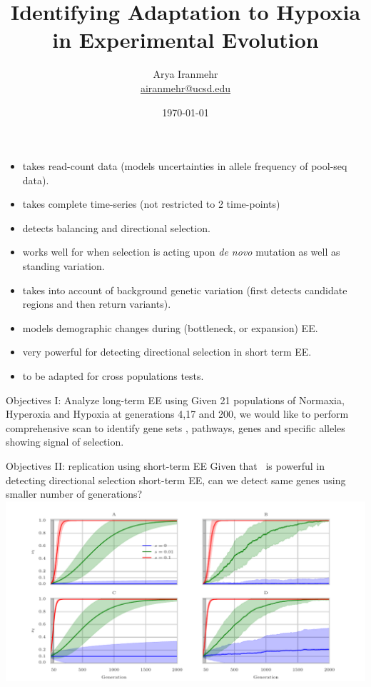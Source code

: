 \documentclass[t]{beamer} %
\title{Identifying Adaptation to Hypoxia in Experimental Evolution}
\subtitle{}
\author[Arya Iranmehr]
{%
  \texorpdfstring{
      \centering
      Arya Iranmehr\\
      \href{mailto:airanmehr@ucsd.edu}{airanmehr@ucsd.edu}
  }
  {Arya Iranmehr}
}
\institute{
Bafna Lab\\
University of California, San Diego}
\date{
\monthyeardate\today}
\begin{document}
\begin{frame}
  \titlepage
\end{frame}


\begin{frame}{	\comale }

\begin{itemize}
\item takes read-count data (models uncertainties in allele frequency of 
pool-seq data).
\item takes complete time-series (not restricted to 2 time-points)
\item detects balancing and directional selection.
\item works well for when selection is acting upon \emph{de novo} mutation as 
well as standing variation.
\item takes into account of background genetic variation (first detects 
candidate regions and then return variants).
\item models demographic changes during (bottleneck, or expansion) EE.
\item very powerful for detecting directional selection in short term EE.
\item to be adapted for cross populations tests.
\end{itemize}
\end{frame}



\begin{frame}{Objectives I: Analyze long-term EE using \comale}
	Given 21 populations of Normaxia, Hyperoxia and Hypoxia at generations 4,17 
	and 200, we would like to perform comprehensive scan to identify gene sets 
	, pathways, genes and specific alleles showing signal of selection.
\end{frame}

\begin{frame}{Objectives II: replication using short-term EE}
	Given that \comale\ is powerful in detecting directional selection 
	short-term 
	EE, can we detect same genes using smaller number of generations?
	\includegraphics[width=\textwidth]{../figures/AF.pdf}
\end{frame}
\end{document}
